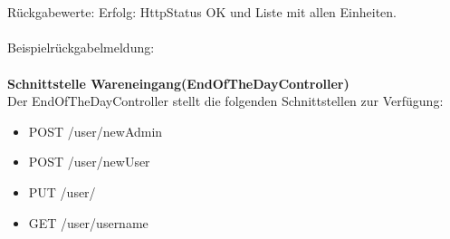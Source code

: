 \\
\\
Rückgabewerte: \tab 					Erfolg: HttpStatus OK und Liste mit allen Einheiten.\\
\\
Beispielrückgabelmeldung:	
\\
\\
\textbf{Schnittstelle Wareneingang(EndOfTheDayController)}
\\
Der EndOfTheDayController stellt die folgenden Schnittstellen zur Verfügung:

\begin{itemize}
	\itemsep0pt
	\item  POST /user/newAdmin
	\item  POST /user/newUser
	\item  PUT /user/
	\item  GET /user/{username}
\end{itemize}

